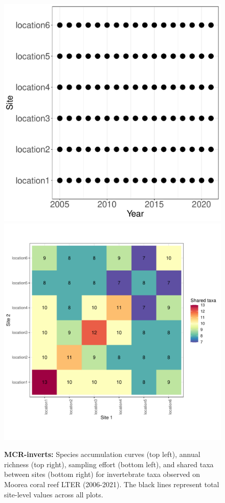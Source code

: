 \documentclass[11pt, oneside]{article}
\begin{document}
\begin{figure}[h!]
\includegraphics[scale = 0.4]{mcr-inverts-castorani_spatiotemporal_sampling_effort.pdf}
\includegraphics[scale = 0.4]{mcr-inverts-castorani_spp_shared.pdf}
\caption{{\bf MCR-inverts:} Species accumulation curves (top left),  annual richness (top right), sampling effort (bottom left), and shared taxa between sites (bottom right) for invertebrate taxa observed on Moorea coral reef LTER (2006-2021). The black lines represent total site-level values across all plots.}
\label{mcr-inverts}
\end{figure}
\end{document}
